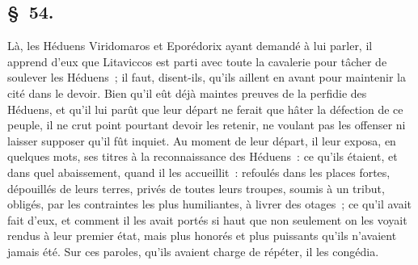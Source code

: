 \documentclass[french,twoside]{book} %
\begin{document}
\subsection[{§ 54.}]{ \textsc{§ 54.} }
\noindent Là, les Héduens Viridomaros et Eporédorix ayant demandé à lui parler, il apprend d’eux que Litaviccos est parti avec toute la cavalerie pour tâcher de soulever les Héduens ; il faut, disent-ils, qu’ils aillent en avant pour maintenir la cité dans le devoir. Bien qu’il eût déjà maintes preuves de la perfidie des Héduens, et qu’il lui parût que leur départ ne ferait que hâter la défection de ce peuple, il ne crut point pourtant devoir les retenir, ne voulant pas les offenser ni laisser supposer qu’il fût inquiet. Au moment de leur départ, il leur exposa, en quelques mots, ses titres à la reconnaissance des Héduens : ce qu’ils étaient, et dans quel abaissement, quand il les accueillit : refoulés dans les places fortes, dépouillés de leurs terres, privés de toutes leurs troupes, soumis à un tribut, obligés, par les contraintes les plus humiliantes, à livrer des otages ; ce qu’il avait fait d’eux, et comment il les avait portés si haut que non seulement on les voyait rendus à leur premier état, mais plus honorés et plus puissants qu’ils n’avaient jamais été. Sur ces paroles, qu’ils avaient charge de répéter, il les congédia.
\end{document}
